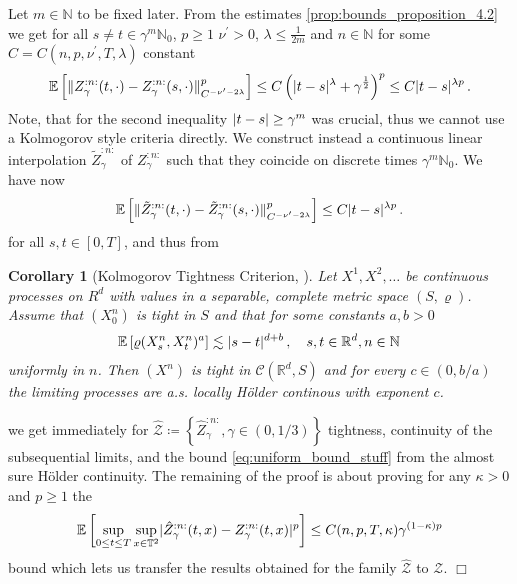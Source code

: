 \documentclass{report}
\newcommand{\NN}{\mathbb{N}}
\newcommand{\NO}{{\mathbb{N}_0}}
\newcommand{\RR}{\mathbb{R}}
\newcommand{\TT}{\mathbb{T}}
\DeclarePairedDelimiter\abs{\lvert}{\rvert} %
\DeclarePairedDelimiter\norm{\lVert}{\rVert}%
\newcommand{\Exp}[1]{\mathbb{E}\left[#1\right]}
\DeclareMathOperator{\DefiningEquality}{\coloneqq}
\newtheorem{corollary}{Corollary}[theorem]
\renewenvironment{proof}{{\bf \emph{Proof (idea):} }}{\hfill $\Box$ \\}
\theoremstyle{remark}
\theoremstyle{definition}
\let\rho\varrho
\begin{document}
\begin{proof}
  Let $m\in\NN$ to be fixed later. From the estimates \autoref{prop:bounds_proposition_4.2} we get for all $s \neq t \in \gamma^m \NO$, $p\ge 1$ $\nu^\prime > 0$, $\lambda \le \frac{1}{2m}$ and $n \in \NN$ for some $C = C(n, p, \nu^\prime, T, \lambda)$ constant 
  \begin{align}
    \label{eq:almost_kolmogorov_criteria}
    \Exp{\norm{Z^{:n:}_\gamma(t, \cdot) - Z^{:n:}_\gamma(s, \cdot)}^p_{C^{-\nu^\prime - 2\lambda}}} \le C \left(\abs{t - s}^\lambda + \gamma^{\frac{1}{2}}\right)^p \le C \abs{t - s}^{\lambda p}\,.
  \end{align}
  Note, that for the second inequality $\abs{t - s} \ge \gamma^m$ was crucial, thus we cannot use a Kolmogorov style criteria directly. We construct instead a continuous linear interpolation $\tilde{Z}^{:n:}_\gamma$ of $Z^{:n:}_\gamma$ such that they coincide on discrete times $\gamma^m \NO$. We have now
  \begin{align}
    \Exp{\norm{\tilde{Z}^{:n:}_\gamma(t, \cdot) - \tilde{Z}^{:n:}_\gamma(s, \cdot)}^p_{C^{-\nu^\prime - 2\lambda}}} \le C \abs{t - s}^{\lambda p}\,.    
  \end{align}
  for all $s, t \in [0, T]$, and thus from
  \begin{corollary}[Kolmogorov Tightness Criterion, {\cite[Corollary 14.9]{kallenberg2013foundations}}]
    Let $X^1, X^2, \ldots$ be continuous processes on $R^d$ with values in a separable, complete metric space $(S, \rho)$. Assume that $(X_0^n)$ is tight in $S$ and that for some constants $a, b > 0$
    \begin{align*}
      \Exp{\rho(X^n_s, X^n_t)^a} \lesssim \abs{s - t}^{d + b}\,, \quad s, t \in \RR^d, n \in \NN\,
    \end{align*}
    uniformly in $n$. Then $(X^n)$ is tight in $\mathcal{C}(\RR^d, S)$ and for every $c \in (0, b/a)$ the limiting processes are a.s. locally Hölder continous with exponent $c$.
  \end{corollary}
  we get immediately for $\hat{\mathcal{Z}} \DefiningEquality \left\{\hat{Z}^{:n:}_{\gamma}, \gamma \in (0, 1/3)\right\}$ tightness, continuity of the subsequential limits, and the bound \eqref{eq:uniform_bound_stuff} from the almost sure Hölder continuity. The remaining of the proof is about proving for any $\kappa > 0$ and $p\ge1$ the
  \begin{align*}
    \Exp{\sup_{0 \le t \le T} \sup_{x \in \TT^2} \abs{ \hat{Z}^{:n:}_\gamma(t, x) - Z^{:n:}_\gamma(t, x)}^p} \le C(n, p, T, \kappa) \gamma^{(1 - \kappa) p}
  \end{align*}
  bound which lets us transfer the results obtained for the family $\hat{\mathcal{Z}}$ to $\mathcal{Z}$. 
\end{proof}
\end{document}
